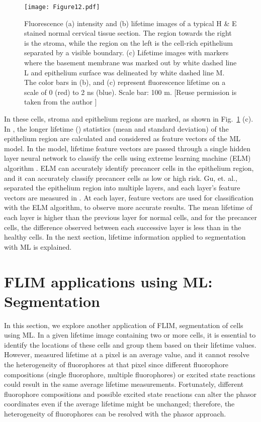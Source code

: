 \documentclass[12pt]{iopart}
\begin{document}
\begin{figure}[!t]
\centering
\texttt{[image: Figure12.pdf]}
\caption{Fluorescence (a) intensity and (b) lifetime images of a typical H \& E stained normal cervical tissue section. The region towards the right is the stroma, while the region on the left is the cell-rich epithelium separated by a visible boundary. (c) Lifetime images with markers where the basement membrane was marked out by white dashed line L and epithelium surface was delineated by white dashed line M. The color bars in (b), and (c) represent fluorescence lifetime on a scale of 0 (red) to 2 ns (blue). Scale bar: 100 m. [Reuse permission is taken from the author \cite{cancer1,cancer2}]}\label{fig1_cancer}
\end{figure}

In these cells, stroma and epithelium regions are marked, as shown in Fig.~\ref{fig1_cancer} (c). In \cite{cancer1}, the longer lifetime () statistics (mean and standard deviation) of the epithelium region are calculated and considered as feature vectors of the ML model. In the model, lifetime feature vectors are passed through a single hidden layer neural network to classify the cells using extreme learning machine (ELM) algorithm \cite{elm}. ELM can accurately identify precancer cells in the epithelium region, and it can accurately classify precancer cells as low or high risk. Gu, et. al., separated the epithelium region into multiple layers, and each layer's feature vectors are measured in \cite{cancer2}. At each layer, feature vectors are used for classification with the ELM algorithm, to observe more accurate results. The mean lifetime of each layer is higher than the previous layer for normal cells, and for the precancer cells, the difference observed between each successive layer is less than in the healthy cells. In the next section, lifetime information applied to segmentation with ML is explained.

\section{FLIM applications using ML: Segmentation} \label{sec3}
In this section, we explore another application of FLIM, segmentation of cells using ML. In a given lifetime image containing two or more cells, it is essential to identify the locations of these cells and group them based on their lifetime values. However, measured lifetime at a pixel is an average value, and it cannot resolve the heterogeneity of fluorophores at that pixel since different fluorophore compositions (single fluorophore, multiple fluorophores) or excited state reactions could result in the same average lifetime measurements. Fortunately, different fluorophore compositions and possible excited state reactions can alter the phasor coordinates even if the average lifetime might be unchanged; therefore, the heterogeneity of fluorophores can be resolved with the phasor approach. 
\end{document}
